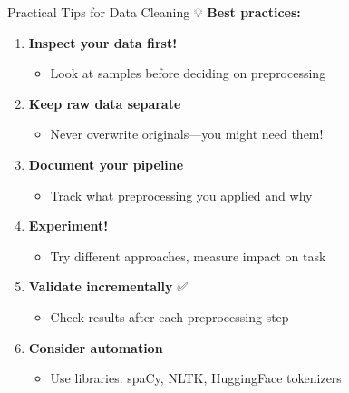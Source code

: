 \documentclass[aspectratio=169]{beamer}
\begin{document}
\begin{frame}[shrink=10]{Practical Tips for Data Cleaning 💡}
    \textbf{Best practices:}

    \begin{enumerate}\setlength{\itemsep}{0pt}
        \item \textbf{Inspect your data first!} 👀
        \begin{itemize}\setlength{\itemsep}{0pt}
            \item Look at samples before deciding on preprocessing
        \end{itemize}

        \item \textbf{Keep raw data separate} 💾
        \begin{itemize}\setlength{\itemsep}{0pt}
            \item Never overwrite originals—you might need them!
        \end{itemize}

        \item \textbf{Document your pipeline} 📝
        \begin{itemize}\setlength{\itemsep}{0pt}
            \item Track what preprocessing you applied and why
        \end{itemize}

        \item \textbf{Experiment!} 🧪
        \begin{itemize}\setlength{\itemsep}{0pt}
            \item Try different approaches, measure impact on task
        \end{itemize}

        \item \textbf{Validate incrementally} ✅
        \begin{itemize}\setlength{\itemsep}{0pt}
            \item Check results after each preprocessing step
        \end{itemize}

        \item \textbf{Consider automation} 🤖
        \begin{itemize}\setlength{\itemsep}{0pt}
            \item Use libraries: spaCy, NLTK, HuggingFace tokenizers
        \end{itemize}
    \end{enumerate}
\end{frame}
\end{document}
